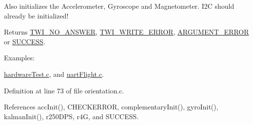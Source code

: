 Also initializes the Accelerometer, Gyroscope and Magnetometer. I2\-C should already be initialized! \begin{DoxyReturn}{Returns}
\hyperlink{group__error_gga2c3e4bb40f36b262a5214e2da2bca9c5a04d5943ba652af2205c88b247e0c659c}{T\-W\-I\-\_\-\-N\-O\-\_\-\-A\-N\-S\-W\-E\-R}, \hyperlink{group__error_gga2c3e4bb40f36b262a5214e2da2bca9c5ac0e3b3463dcaf220e54794b4711708c9}{T\-W\-I\-\_\-\-W\-R\-I\-T\-E\-\_\-\-E\-R\-R\-O\-R}, \hyperlink{group__error_gga2c3e4bb40f36b262a5214e2da2bca9c5a49ccf277a69dd938c591928aa27c66cc}{A\-R\-G\-U\-M\-E\-N\-T\-\_\-\-E\-R\-R\-O\-R} or \hyperlink{group__error_gga2c3e4bb40f36b262a5214e2da2bca9c5ac7f69f7c9e5aea9b8f54cf02870e2bf8}{S\-U\-C\-C\-E\-S\-S}. 
\end{DoxyReturn}
\begin{Desc}
\item[Examples\-: ]\par
\hyperlink{hardware_test_8c-example}{hardware\-Test.\-c}, and \hyperlink{uart_flight_8c-example}{uart\-Flight.\-c}.\end{Desc}


Definition at line 73 of file orientation.\-c.



References acc\-Init(), C\-H\-E\-C\-K\-E\-R\-R\-O\-R, complementary\-Init(), gyro\-Init(), kalman\-Init(), r250\-D\-P\-S, r4\-G, and S\-U\-C\-C\-E\-S\-S.


